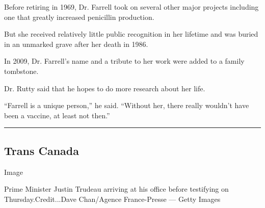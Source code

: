 Before retiring in 1969, Dr. Farrell took on several other major
projects including one that greatly increased penicillin production.

But she received relatively little public recognition in her lifetime
and was buried in an unmarked grave after her death in 1986.

In 2009, Dr. Farrell's name and a tribute to her work were added to a
family tombstone.

Dr. Rutty said that he hopes to do more research about her life.

``Farrell is a unique person,'' he said. ``Without her, there really
wouldn't have been a vaccine, at least not then.''

\begin{center}\rule{0.5\linewidth}{\linethickness}\end{center}

\hypertarget{trans-canada}{%
\subsection{Trans Canada}\label{trans-canada}}

Image

Prime Minister Justin Trudeau arriving at his office before testifying
on Thursday.Credit...Dave Chan/Agence France-Presse --- Getty Images

